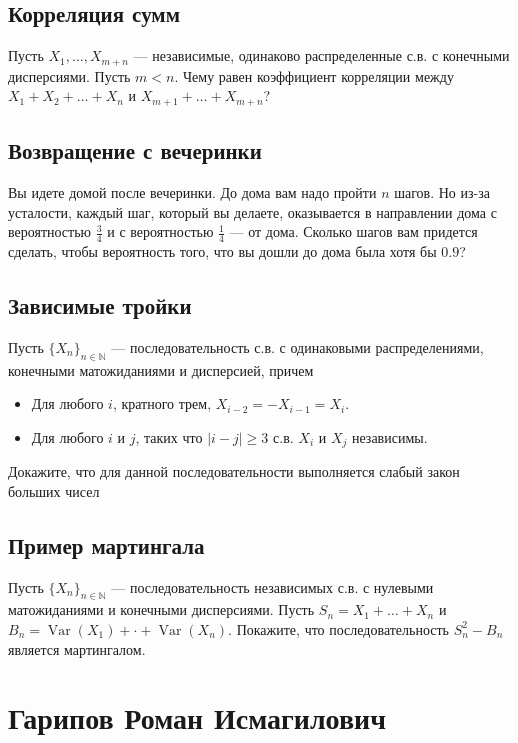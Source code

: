 \documentclass[12pt]{article}
\newcommand\N{\mathbb{N}}
\DeclareMathOperator{\Var}{Var}
\begin{document}
\subsection{Корреляция сумм}

Пусть $X_1, \dots, X_{m + n}$ --- независимые, одинаково распределенные с.в. с конечными дисперсиями. Пусть $m < n$. Чему равен коэффициент корреляции между $X_1 + X_2 + \dots + X_n$ и $X_{m + 1} + \dots + X_{m + n}$?

\subsection{Возвращение с вечеринки}

Вы идете домой после вечеринки. До дома вам надо пройти $n$ шагов. Но из-за усталости, каждый шаг, который вы делаете, оказывается в направлении дома с вероятностью $\frac{3}{4}$ и с вероятностью $\frac{1}{4}$ --- от дома. Сколько шагов вам придется сделать, чтобы вероятность того, что вы дошли до дома была хотя бы $0.9$?

\subsection{Зависимые тройки}
Пусть $\{X_n\}_{n \in \N}$ --- последовательность с.в. с одинаковыми распределениями, конечными матожиданиями и дисперсией, причем
\begin{itemize}
    \item Для любого $i$, кратного трем, $X_{i - 2} = - X_{i - 1} = X_{i}$. 
    \item Для любого $i$ и $j$, таких что $|i - j| \ge 3$ с.в. $X_i$ и $X_j$ независимы.
\end{itemize}
Докажите, что для данной последовательности выполняется слабый закон больших чисел


\subsection{Пример мартингала}

Пусть $\{X_n\}_{n \in \N}$ --- последовательность независимых с.в. с нулевыми матожиданиями и конечными дисперсиями. Пусть $S_n = X_1 + \dots + X_n$ и $B_n = \Var(X_1) + \cdot + \Var(X_n)$. Покажите, что последовательность $S_n^2 - B_n$ является мартингалом.


\newpage
\section{Гарипов Роман Исмагилович}
\end{document}

